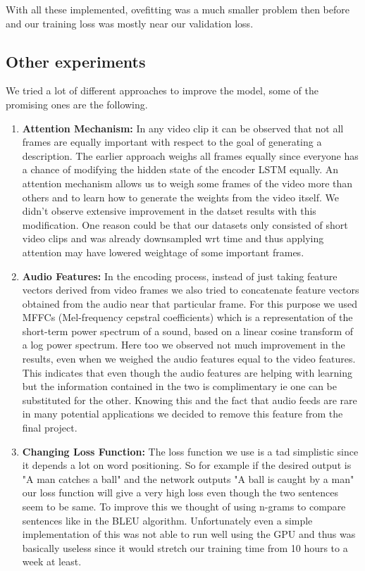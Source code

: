 \documentclass[12pt]{article}
\begin{document}
With all these implemented, ovefitting was a much smaller problem then before and our training loss was mostly near our validation loss.
\subsection{Other experiments}

We tried a lot of different approaches to improve the model, some of the promising ones are the following.
\begin{enumerate}

\item \textbf{Attention Mechanism: } In any video clip it can be observed that not all frames are equally important with respect to the goal of generating a description. The earlier approach weighs all frames equally since everyone has a chance of modifying the hidden state of the encoder LSTM equally. An attention mechanism allows us to weigh some frames of the video more than others and to learn how to generate the weights from the video itself. We didn't observe extensive improvement in the datset results with this modification. One reason could be that our datasets only consisted of short video clips and was already downsampled wrt time and thus applying attention may have lowered weightage of some important frames.
\item \textbf{Audio Features: } In the encoding process, instead of just taking feature vectors derived from video frames we also tried to concatenate feature vectors obtained from the audio near that particular frame. For this purpose we used MFFCs (Mel-frequency cepstral coefficients) which is a representation of the short-term power spectrum of a sound, based on a linear cosine transform of a log power spectrum. Here too we observed not much improvement in the results, even when we weighed the audio features equal to the video features. This indicates that even though the audio features are helping with learning but the information contained in the two is complimentary ie one can be substituted for the other. Knowing this and the fact that audio feeds are rare in many potential applications we decided to remove this feature from the final project.
\item \textbf{Changing Loss Function: } The loss function we use is a tad simplistic since it depends a lot on word positioning. So for example if the desired output is "A man catches a ball" and the network outputs "A ball is caught by a man" our loss function will give a very high loss even though the two sentences seem to be same. To improve this we thought of using n-grams to compare sentences like in the BLEU algorithm. Unfortunately even a simple implementation of this was not able to run well using the GPU and thus was basically useless since it would stretch our training time from 10 hours to a week at least.

\end{enumerate}
\end{document}
